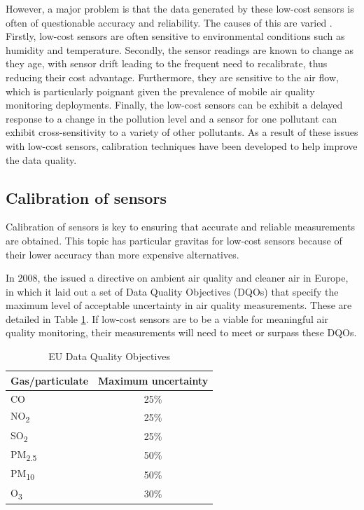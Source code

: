 \documentclass[11pt]{report}
\begin{document}
However, a major problem is that the data generated by these low-cost sensors is often of questionable accuracy and reliability. The causes of this are varied \citep{Clements2017lowcostworkshop}. Firstly, low-cost sensors are often sensitive to   environmental conditions such as humidity and temperature. Secondly, the sensor readings are known to change as they age, with sensor drift leading to the frequent need to recalibrate, thus reducing their cost advantage. Furthermore, they are sensitive to the air flow, which is particularly poignant given the prevalence of mobile air quality monitoring deployments. Finally, the low-cost sensors can be exhibit a delayed response to a change in the pollution level and a sensor for one pollutant can exhibit cross-sensitivity to a variety of other pollutants. As a result of these issues with low-cost sensors, calibration techniques have been developed to help improve the data quality.

\subsection{Calibration of sensors}

Calibration of sensors is key to ensuring that accurate and reliable measurements are obtained. This topic has particular gravitas for low-cost sensors because of their lower accuracy than more expensive alternatives.

In 2008, the \cite{eudir2008airquality} issued a directive on ambient air quality and cleaner air in Europe, in which it laid out a set of Data Quality Objectives (DQOs) that specify the maximum level of acceptable uncertainty in air quality measurements. These are detailed in Table \ref{dataqualityobjectives}. If low-cost sensors are to be a viable for meaningful air quality monitoring, their measurements will need to meet or surpass these DQOs.


\begin{table}[!htbp]
  \centering
  \caption{EU Data Quality Objectives}
  \label{dataqualityobjectives}
  \begin{tabular}{ l c}
  \toprule
  Gas/particulate & Maximum uncertainty \\ \midrule
  CO & 25\% \\
  NO\textsubscript{2} & 25\% \\
  SO\textsubscript{2} & 25\% \\
  PM\textsubscript{2.5} & 50\% \\
  PM\textsubscript{10} & 50\% \\
  O\textsubscript{3} & 30\% \\ \bottomrule
  \end{tabular}
\end{table}
\end{document}
